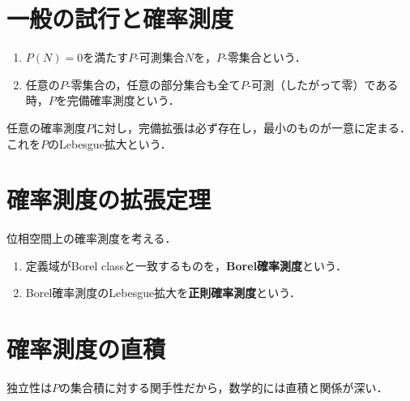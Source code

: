 \documentclass[uplatex,dvipdfmx]{jsreport}
\begin{document}
\section{一般の試行と確率測度}

\begin{definition}\mbox{}\label{def-complete-measure}
    \begin{enumerate}
        \item $P(N)=0$を満たす$P$-可測集合$N$を，$P$-零集合という．
        \item 任意の$P$-零集合の，任意の部分集合も全て$P$-可測（したがって零）である時，$P$を完備確率測度という．
    \end{enumerate}
\end{definition}

\begin{proposition}
    任意の確率測度$P$に対し，完備拡張は必ず存在し，最小のものが一意に定まる．これを$P$のLebesgue拡大という．
\end{proposition}

\section{確率測度の拡張定理}

\begin{definition}\label{def-regular-measure}
    位相空間上の確率測度を考える．
    \begin{enumerate}
        \item 定義域がBorel classと一致するものを，\textbf{Borel確率測度}という．
        \item Borel確率測度のLebesgue拡大を\textbf{正則確率測度}という．
    \end{enumerate}
\end{definition}

\section{確率測度の直積}

\begin{tcolorbox}[colframe=ForestGreen, colback=ForestGreen!10!white,breakable,colbacktitle=ForestGreen!40!white,coltitle=black,fonttitle=\bfseries\sffamily,
title=]
    独立性は$P$の集合積に対する関手性だから，数学的には直積と関係が深い．
\end{tcolorbox}
\end{document}
